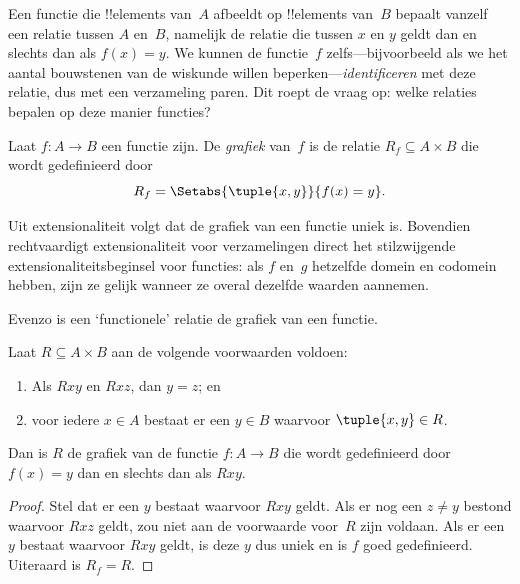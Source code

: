 \documentclass[../../../include/open-logic-section]{subfiles}
\begin{document}


\begin{explain}
Een functie die !!{element}s van~$A$ afbeeldt op !!{element}s van~$B$
bepaalt vanzelf een relatie tussen $A$ en~$B$, namelijk de relatie die
tussen $x$ en $y$ geldt dan en slechts dan als $f(x) = y$. We kunnen
de functie~$f$ zelfs---bijvoorbeeld als we het aantal bouwstenen van
de wiskunde willen beperken---\emph{identificeren} met deze relatie,
dus met een verzameling paren. Dit roept de vraag op: welke relaties
bepalen op deze manier functies?
\end{explain}

\begin{defn} Laat $f\colon A \to B$ een
functie zijn. De \emph{grafiek} van~$f$ is de relatie $R_f \subseteq A
\times B$ die wordt gedefinieerd door
\[
R_f = \Setabs{\tuple{x,y}}{f(x) = y}.
\]
\end{defn}

\begin{explain}
Uit extensionaliteit volgt dat de grafiek van een functie uniek is.
Bovendien rechtvaardigt extensionaliteit voor verzamelingen direct het
stilzwijgende extensionaliteitsbeginsel voor functies: als $f$ en~$g$
hetzelfde domein en codomein hebben, zijn ze gelijk wanneer ze overal
dezelfde waarden aannemen.

Evenzo is een ‘functionele’ relatie de grafiek van een functie.
\end{explain}

\begin{prop}
Laat $R \subseteq A \times B$ aan de volgende voorwaarden voldoen:
\begin{enumerate}
\item Als $Rxy$ en $Rxz$, dan $y = z$; en
\item voor iedere $x \in A$ bestaat er een $y \in B$ waarvoor
$\tuple{x, y} \in R$.
\end{enumerate}
Dan is $R$ de grafiek van de functie $f\colon A \to B$ die wordt
gedefinieerd door $f(x) = y$ dan en slechts dan als $Rxy$.
\end{prop}

\begin{proof}
Stel dat er een $y$ bestaat waarvoor $Rxy$ geldt. Als er nog een $z
\neq y$ bestond waarvoor $Rxz$ geldt, zou niet aan de voorwaarde
voor~$R$ zijn voldaan. Als er een $y$ bestaat waarvoor $Rxy$ geldt, is
deze $y$ dus uniek en is $f$ goed gedefinieerd. Uiteraard is $R_f =
R$.
\end{proof}
\end{document}
